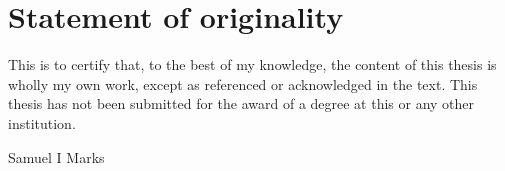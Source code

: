 \chapter*{Statement of originality}
This is to certify that, to the best of my knowledge, the content of this thesis is wholly my own work, except as referenced or acknowledged in the text. This thesis has not been submitted for the award of a degree at this or any other institution.

Samuel I Marks

%

%

%

%

\listoftables

\listoffigures

\cleardoublepage

\setcounter{page}{1}








\renewcommand{\theHchapter}{A\arabic{chapter}}
\renewcommand{\theHsection}{A\arabic{section}}


%
\renewcommand{\bibname}{Bibliography}

 
{}



\printglossary

